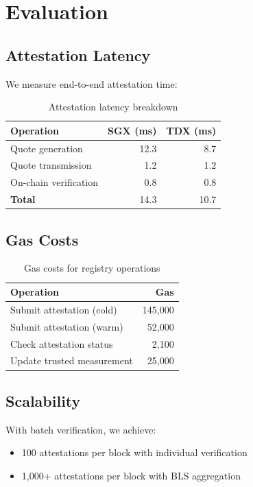 \documentclass[11pt,a4paper]{article}
\theoremstyle{definition}
\begin{document}
\section{Evaluation}

\subsection{Attestation Latency}

We measure end-to-end attestation time:

\begin{table}[h]
\centering
\begin{tabular}{lrr}
\toprule
\textbf{Operation} & \textbf{SGX (ms)} & \textbf{TDX (ms)} \\
\midrule
Quote generation & 12.3 & 8.7 \\
Quote transmission & 1.2 & 1.2 \\
On-chain verification & 0.8 & 0.8 \\
\midrule
\textbf{Total} & 14.3 & 10.7 \\
\bottomrule
\end{tabular}
\caption{Attestation latency breakdown}
\end{table}

\subsection{Gas Costs}

\begin{table}[h]
\centering
\begin{tabular}{lr}
\toprule
\textbf{Operation} & \textbf{Gas} \\
\midrule
Submit attestation (cold) & 145,000 \\
Submit attestation (warm) & 52,000 \\
Check attestation status & 2,100 \\
Update trusted measurement & 25,000 \\
\bottomrule
\end{tabular}
\caption{Gas costs for registry operations}
\end{table}

\subsection{Scalability}

With batch verification, we achieve:
\begin{itemize}
    \item 100 attestations per block with individual verification
    \item 1,000+ attestations per block with BLS aggregation
\end{itemize}
\end{document}

